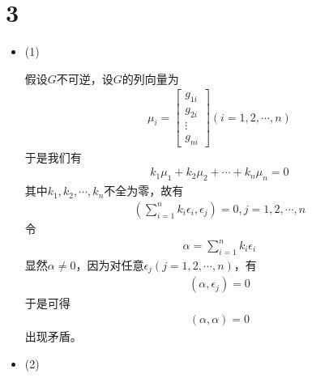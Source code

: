 \documentclass{article}
\begin{document}
\section*{3}

\begin{itemize}
  \item (1)

        假设$G$不可逆，设$G$的列向量为
        \begin{align*}
          \mu_i = \begin{bmatrix}
                    g_{1i} \\
                    g_{2i} \\
                    \vdots \\
                    g_{ni}
                  \end{bmatrix}
          (i = 1, 2, \cdots, n)
        \end{align*}
        于是我们有
        \begin{align*}
          k_1 \mu_1 + k_2 \mu_2 + \cdots + k_n \mu_n = 0
        \end{align*}
        其中$k_1, k_2, \cdots, k_n$不全为零，故有
        \begin{align*}
          (\sum \limits_{i = 1}^n k_i \epsilon_i, \epsilon_j) = 0, j = 1, 2, \cdots, n
        \end{align*}
        令
        \begin{align*}
          \alpha = \sum \limits_{i = 1}^n k_i \epsilon_i
        \end{align*}
        显然$\alpha \neq 0$，因为对任意$\epsilon_j(j = 1, 2, \cdots, n)$，有
        \begin{align*}
          (\alpha, \epsilon_j) = 0
        \end{align*}
        于是可得
        \begin{align*}
          (\alpha, \alpha) = 0
        \end{align*}
        出现矛盾。
  \item (2)


\end{itemize}
\end{document}
